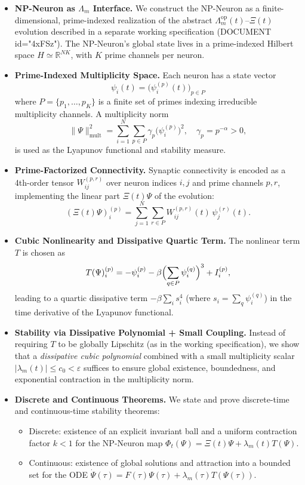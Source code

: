 \documentclass[11pt]{article}
\begin{document}
\begin{itemize}[leftmargin=*]
  \item \textbf{NP-Neuron as \(\Lambda_m\) Interface.}
  We construct the NP-Neuron as a finite-dimensional, prime-indexed realization of the abstract \(\Lambda_m^{\mathrm{op}}(t)\)–\(\Xi(t)\) evolution described in a separate working specification (DOCUMENT id="4xFSz"). The NP-Neuron's global state lives in a prime-indexed Hilbert space \(H \simeq \mathbb{R}^{N K}\), with \(K\) prime channels per neuron.

  \item \textbf{Prime-Indexed Multiplicity Space.}
  Each neuron has a state vector
  \[
  \psi_i(t) = \bigl(\psi_i^{(p)}(t)\bigr)_{p \in P}
  \]
  where \(P=\{p_1,\dots,p_K\}\) is a finite set of primes indexing irreducible multiplicity channels.
  A multiplicity norm
  \[
  \|\Psi\|_{\mathrm{mult}}^2 = \sum_{i=1}^N \sum_{p\in P} \gamma_p \bigl(\psi_i^{(p)}\bigr)^2, \quad \gamma_p = p^{-\alpha}>0,
  \]
  is used as the Lyapunov functional and stability measure.

  \item \textbf{Prime-Factorized Connectivity.}
  Synaptic connectivity is encoded as a 4th-order tensor \(W_{ij}^{(p,r)}\) over neuron indices \(i,j\) and prime channels \(p,r\), implementing the linear part \(\Xi(t)\Psi\) of the evolution:
  \[
  (\Xi(t)\Psi)_i^{(p)} = \sum_{j=1}^N \sum_{r\in P} W_{ij}^{(p,r)}(t)\, \psi_j^{(r)}(t).
  \]

  \item \textbf{Cubic Nonlinearity and Dissipative Quartic Term.}
  The nonlinear term \(T\) is chosen as
  \[
  T(\Psi)_i^{(p)} = -\psi_i^{(p)} - \beta \Bigl(\sum_{q\in P} \psi_i^{(q)}\Bigr)^3 + I_i^{(p)},
  \]
  leading to a quartic dissipative term \(-\beta \sum_i s_i^4\) (where \(s_i=\sum_q \psi_i^{(q)}\)) in the time derivative of the Lyapunov functional.

  \item \textbf{Stability via Dissipative Polynomial + Small Coupling.}
  Instead of requiring \(T\) to be globally Lipschitz (as in the working specification), we show that a \emph{dissipative cubic polynomial} combined with a small multiplicity scalar \(|\lambda_m(t)|\le c_0<\varepsilon\) suffices to ensure global existence, boundedness, and exponential contraction in the multiplicity norm.

  \item \textbf{Discrete and Continuous Theorems.}
  We state and prove discrete-time and continuous-time stability theorems:
  \begin{itemize}
    \item Discrete: existence of an explicit invariant ball and a uniform contraction factor \(k<1\) for the NP-Neuron map \(\Phi_t(\Psi) = \Xi(t)\Psi + \lambda_m(t)T(\Psi)\).
    \item Continuous: existence of global solutions and attraction into a bounded set for the ODE \(\dot{\Psi}(\tau) = F(\tau)\Psi(\tau) + \lambda_m(\tau)T(\Psi(\tau))\).
  \end{itemize}


\end{itemize}
\end{document}
